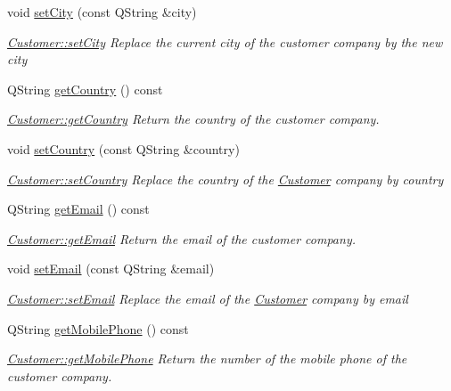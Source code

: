 \begin{DoxyCompactItemize}
void \hyperlink{classCustomer_a1fb29f507135a9f21b29e7799aec14f0}{set\-City} (const Q\-String \&city)
\begin{DoxyCompactList}\small\item\em \hyperlink{classCustomer_a1fb29f507135a9f21b29e7799aec14f0}{Customer\-::set\-City} Replace the current city of the customer company by the new {\itshape city} \end{DoxyCompactList}\item 
Q\-String \hyperlink{classCustomer_a426126096db853802249e10506dc138c}{get\-Country} () const 
\begin{DoxyCompactList}\small\item\em \hyperlink{classCustomer_a426126096db853802249e10506dc138c}{Customer\-::get\-Country} Return the country of the customer company. \end{DoxyCompactList}\item 
void \hyperlink{classCustomer_a81545977d1de88b4ffd6f6b1356ea118}{set\-Country} (const Q\-String \&country)
\begin{DoxyCompactList}\small\item\em \hyperlink{classCustomer_a81545977d1de88b4ffd6f6b1356ea118}{Customer\-::set\-Country} Replace the country of the \hyperlink{classCustomer}{Customer} company by {\itshape country} \end{DoxyCompactList}\item 
Q\-String \hyperlink{classCustomer_a6ab797361537bf4c8b35cce5f1562299}{get\-Email} () const 
\begin{DoxyCompactList}\small\item\em \hyperlink{classCustomer_a6ab797361537bf4c8b35cce5f1562299}{Customer\-::get\-Email} Return the email of the customer company. \end{DoxyCompactList}\item 
void \hyperlink{classCustomer_a64b383efde5855bde7ef385c6f73e45d}{set\-Email} (const Q\-String \&email)
\begin{DoxyCompactList}\small\item\em \hyperlink{classCustomer_a64b383efde5855bde7ef385c6f73e45d}{Customer\-::set\-Email} Replace the email of the \hyperlink{classCustomer}{Customer} company by {\itshape email} \end{DoxyCompactList}\item 
Q\-String \hyperlink{classCustomer_a08546759b1b1f046389bc6ab6b467149}{get\-Mobile\-Phone} () const 
\begin{DoxyCompactList}\small\item\em \hyperlink{classCustomer_a08546759b1b1f046389bc6ab6b467149}{Customer\-::get\-Mobile\-Phone} Return the number of the mobile phone of the customer company. \end{DoxyCompactList}\item 

\end{DoxyCompactItemize}
